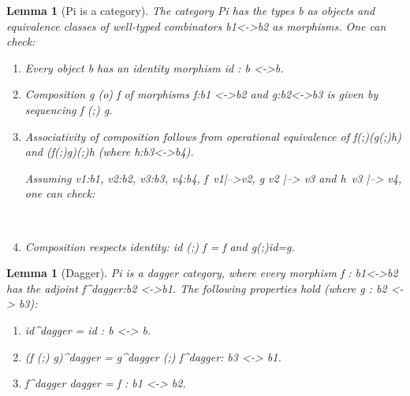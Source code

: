 \documentclass[preprint]{sigplanconf}
\newtheorem{lemma}[theorem]{Lemma}
\begin{document}
\begin{lemma}[{{Pi}} is a category]
  The category {{Pi}} has the types {{b}} as objects and equivalence
  classes of well-typed combinators {{b1<->b2}} as morphisms. One can
  check:
  \begin{enumerate}
  \item Every object {{b}} has an identity morphism {{id : b <->b}}.
  \item Composition {{g (o) f}} of morphisms {{f:b1 <->b2}} and
    {{g:b2<->b3}} is given by sequencing {{f (;) g}}. 
  \item Associativity of composition follows from operational
    equivalence of {{f(;)(g(;)h)}} and {{(f(;)g)(;)h}} (where
    {{h:b3<->b4}}). 

    Assuming {{v1:b1}}, {{v2:b2}}, {{v3:b3}}, {{v4:b4}},
    {{f~v1|-->v2}}, {{g v2 |--> v3}} and {{h~v3 |--> v4}}, one can
    check:

\vspace{-20pt}
    \begin{multicols}{2}
      \begin{scriptsize}
        
~

      \end{scriptsize}
    \end{multicols}

  \item Composition respects identity: {{id (;) f = f}} and {{g(;)id=g}}.
  \end{enumerate}
\end{lemma}

\begin{lemma}[Dagger]
  {{Pi}} is a dagger category, where every morphism {{f : b1<->b2}}
  has the adjoint {{f^{dagger}:b2 <->b1}}. The following properties
  hold (where {{g : b2 <-> b3}}): 
  \begin{enumerate}
  \item {{id^{dagger} = id : b <-> b}}.
  \item {{(f (;) g)^{dagger} = g^{dagger} (;) f^{dagger}: b3 <-> b1}}.
  \item {{f^{dagger dagger} = f : b1 <-> b2}}.
  \end{enumerate}
\end{lemma}
\end{document}
